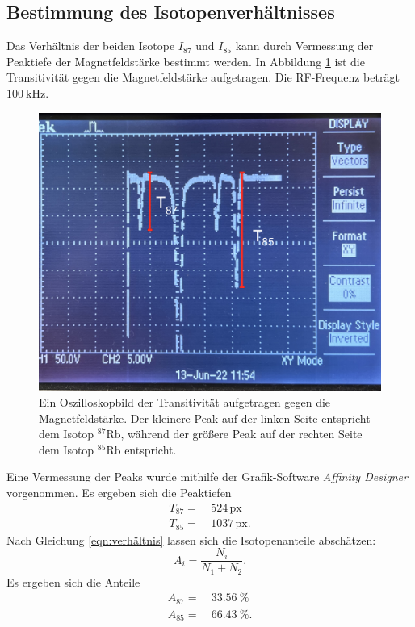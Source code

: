 \subsection{Bestimmung des Isotopenverhältnisses}
\label{subsec:verhältniss}
Das Verhältnis der beiden Isotope $I_{87}$ und $I_{85}$ kann durch Vermessung
der Peaktiefe der Magnetfeldstärke bestimmt werden. In Abbildung \ref{fig:peakbild}
ist die Transitivität gegen die Magnetfeldstärke aufgetragen. Die RF-Frequenz beträgt $\SI{100}{\kilo\hertz}$.
\begin{figure}
  \centering
  \caption{Ein Oszilloskopbild der Transitivität aufgetragen gegen die Magnetfeldstärke. Der kleinere Peak auf der linken Seite entspricht dem Isotop $^{87}\text{Rb}$, während der größere Peak auf der rechten Seite dem Isotop $^{85}\text{Rb}$ entspricht.}
  \label{fig:peakbild}
  \includegraphics[scale=0.1]{pictures/Peakbild.jpg}
\end{figure}
Eine Vermessung der Peaks wurde mithilfe der Grafik-Software \textit{Affinity Designer} \cite{affinity}
vorgenommen. Es ergeben sich die Peaktiefen
\begin{align}
  T_{87} =\ & \num{524}\, \text{px} \\
  T_{85} =\ & \num{1037}\, \text{px}.
\end{align}
Nach Gleichung \ref{eqn:verhältnis} lassen sich die Isotopenanteile abschätzen:
\begin{equation}
  \label{eqn:verhältnis}
 	A_{i} = \frac{N_{i}}{N_{1} + N_{2}}.
\end{equation}
Es ergeben sich die Anteile
\begin{align}
	A_{87} =\ & \SI{33.56}{\percent} \\
  A_{85} =\ & \SI{66.43}{\percent}.
\end{align}

